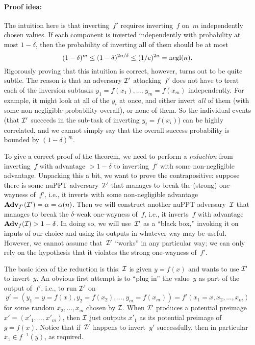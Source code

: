 \documentclass[11pt]{article}
\begin{document}
\paragraph{Proof idea:} The intuition here is that inverting~$f'$
requires inverting~$f$ on~$m$ independently chosen values.  If each
component is inverted independently with probability at most
$1-\delta$, then the probability of inverting all of them should be at
most
\[ (1-\delta)^{m} \leq (1-\delta)^{2n/\delta} \leq (1/e)^{2n} =
  \operatorname{negl}(n). \] Rigorously proving that this intuition is correct,
however, turns out to be quite subtle.  The reason is that an
adversary $\mathcal{I}'$ attacking~$f'$ does not have to treat each of the
inversion subtasks $y_{1} = f(x_{1}), \ldots, y_{m} = f(x_{m})$
independently.  For example, it might look at all of the $y_{i}$ at
once, and either invert \emph{all} of them (with some non-negligible
probability overall), or none of them.  So the individual events (that
$\mathcal{I}'$ succeeds in the sub-task of inverting $y_{i} = f(x_{i})$) can
be highly correlated, and we cannot simply say that the overall
success probability is bounded by $(1-\delta)^{m}$.

To give a correct proof of the theorem, we need to perform a
\emph{reduction} from inverting~$f$ with advantage $> 1-\delta$ to
inverting~$f'$ with some non-negligible advantage.  Unpacking this a
bit, we want to prove the contrapositive: suppose there is some nuPPT
adversary~$\mathcal{I}'$ that manages to break the (strong) one-wayness
of~$f'$, i.e., it inverts with some non-negligible advantage
$\mathbf{Adv}_{f'}(\mathcal{I}') = \alpha = \alpha(n)$.  Then we will construct
another nuPPT adversary~$\mathcal{I}$ that manages to break the $\delta$-weak
one-wayness of~$f$, i.e., it inverts~$f$ with advantage
$\mathbf{Adv}_{f}(\mathcal{I}) > 1-\delta$.  In doing so, we will use~$\mathcal{I}'$ as a
``black box,'' invoking it on inputs of our choice and using its
outputs in whatever way may be useful.  However, we cannot assume
that~$\mathcal{I}'$ ``works'' in any particular way; we can only rely on the
hypothesis that it violates the strong one-wayness of~$f'$.

The basic idea of the reduction is this: $\mathcal{I}$ is given $y = f(x)$
and wants to use $\mathcal{I}'$ to invert~$y$.  An obvious first attempt is
to ``plug in'' the value~$y$ as part of the output of~$f'$, i.e., to
run $\mathcal{I}'$ on
\[ y' = (y_{1} = y = f(x), y_{2} = f(x_{2}), \ldots, y_{m} = f(x_{m}))
  = f'(x_{1} = x, x_{2}, \ldots, x_{m}) \] for some random
$x_{2}, \ldots, x_{m}$ chosen by $\mathcal{I}$.  When $\mathcal{I}'$ produces a
potential preimage $x'=(x'_{1},\ldots,x'_{m})$, then $\mathcal{I}$ just
outputs $x'_{1}$ as its potential preimage of $y=f(x)$.  Notice that
if~$\mathcal{I}'$ happens to invert~$y'$ successfully, then in particular
$x_{1} \in f^{-1}(y)$, as required.
\end{document}
